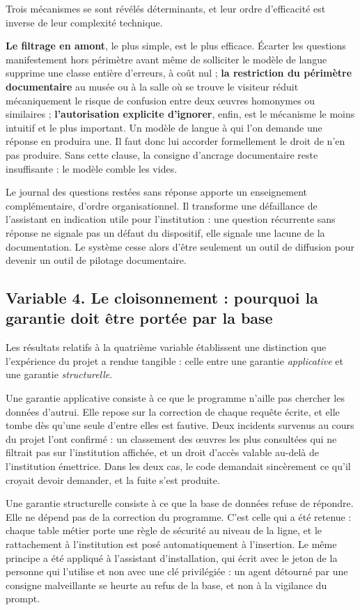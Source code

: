 Trois mécanismes se sont révélés déterminants, et leur ordre d'efficacité est
inverse de leur complexité technique.

\textbf{Le filtrage en amont}, le plus simple, est le plus efficace. Écarter
les questions manifestement hors périmètre avant même de solliciter le modèle
de langue supprime une classe entière d'erreurs, à coût nul ; \textbf{la
restriction du périmètre documentaire} au musée ou à la salle où se trouve le
visiteur réduit mécaniquement le risque de confusion entre deux œuvres
homonymes ou similaires ; \textbf{l'autorisation explicite d'ignorer}, enfin,
est le mécanisme le moins intuitif et le plus important. Un modèle de langue à
qui l'on demande une réponse en produira une. Il faut donc lui accorder
formellement le droit de n'en pas produire. Sans cette clause, la consigne
d'ancrage documentaire reste insuffisante : le modèle comble les vides.

Le journal des questions restées sans réponse apporte un enseignement
complémentaire, d'ordre organisationnel. Il transforme une défaillance de
l'assistant en indication utile pour l'institution : une question récurrente
sans réponse ne signale pas un défaut du dispositif, elle signale une lacune de
la documentation. Le système cesse alors d'être seulement un outil de diffusion
pour devenir un outil de pilotage documentaire.

\subsection{Variable 4. Le cloisonnement : pourquoi la garantie doit être portée par la base}

Les résultats relatifs à la quatrième variable établissent une distinction que
l'expérience du projet a rendue tangible : celle entre une garantie
\emph{applicative} et une garantie \emph{structurelle}.

Une garantie applicative consiste à ce que le programme n'aille pas chercher les
données d'autrui. Elle repose sur la correction de chaque requête écrite, et
elle tombe dès qu'une seule d'entre elles est fautive. Deux incidents survenus
au cours du projet l'ont confirmé : un classement des œuvres les plus consultées
qui ne filtrait pas sur l'institution affichée, et un droit d'accès valable
au-delà de l'institution émettrice. Dans les deux cas, le code demandait
sincèrement ce qu'il croyait devoir demander, et la fuite s'est produite.

Une garantie structurelle consiste à ce que la base de données refuse de
répondre. Elle ne dépend pas de la correction du programme. C'est celle qui a
été retenue : chaque table métier porte une règle de sécurité au niveau de la
ligne, et le rattachement à l'institution est posé automatiquement à
l'insertion. Le même principe a été appliqué à l'assistant d'installation, qui
écrit avec le jeton de la personne qui l'utilise et non avec une clé
privilégiée : un agent détourné par une consigne malveillante se heurte au refus
de la base, et non à la vigilance du prompt.

